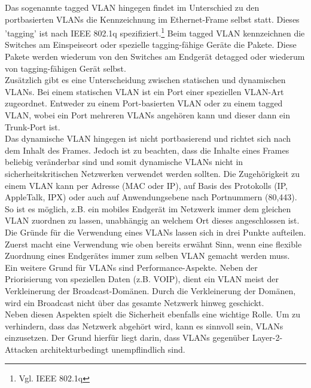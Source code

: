 Das sogenannte tagged VLAN hingegen findet im Unterschied zu den portbasierten VLANs die Kennzeichnung im Ethernet-Frame selbst statt.
Dieses 'tagging' ist nach IEEE 802.1q spezifiziert.\footnote{Vgl. IEEE 802.1q}
Beim tagged VLAN kennzeichnen die Switches am Einspeiseort oder spezielle tagging-fähige Geräte die Pakete.
Diese Pakete werden wiederum von den Switches am Endgerät detagged oder wiederum von tagging-fähigen Gerät selbst.\\
Zusätzlich gibt es eine Unterscheidung zwischen statischen und dynamischen VLANs.
Bei einem statischen VLAN ist ein Port einer speziellen VLAN-Art zugeordnet.
Entweder zu einem Port-basierten VLAN oder zu einem tagged VLAN, wobei ein Port mehreren VLANs angehören kann und dieser dann ein Trunk-Port ist.\\
Das dynamische VLAN hingegen ist nicht portbasierend und richtet sich nach dem Inhalt des Frames. Jedoch ist zu beachten, dass die Inhalte eines Frames beliebig veränderbar sind und somit dynamische VLANs nicht in sicherheitskritischen Netzwerken verwendet werden sollten.
Die Zugehörigkeit zu einem VLAN kann per Adresse (MAC oder IP), auf Basis des Protokolls (IP, AppleTalk, IPX) oder auch auf Anwendungsebene nach Portnummern (80,443).
So ist es möglich, z.B. ein mobiles Endgerät im Netzwerk immer dem gleichen VLAN zuordnen zu lassen, unabhängig an welchem Ort dieses angeschlossen ist.\\

Die Gründe für die Verwendung eines VLANs lassen sich in drei Punkte aufteilen.
Zuerst macht eine Verwendung wie oben bereits erwähnt Sinn, wenn eine flexible Zuordnung eines Endgerätes immer zum selben VLAN gemacht werden muss.\\
Ein weitere Grund für VLANs sind Performance-Aspekte. Neben der Priorisierung von speziellen Daten (z.B. VOIP), dient ein VLAN meist der Verkleinerung der Broadcast-Domänen.
Durch die Verkleinerung der Domänen, wird ein Broadcast nicht über das gesamte Netzwerk hinweg geschickt.\\
Neben diesen Aspekten spielt die Sicherheit ebenfalls eine wichtige Rolle.
Um zu verhindern, dass das Netzwerk abgehört wird, kann es sinnvoll sein, VLANs einzusetzen.
Der Grund hierfür liegt darin, dass VLANs gegenüber Layer-2-Attacken architekturbedingt unempflindlich sind.


